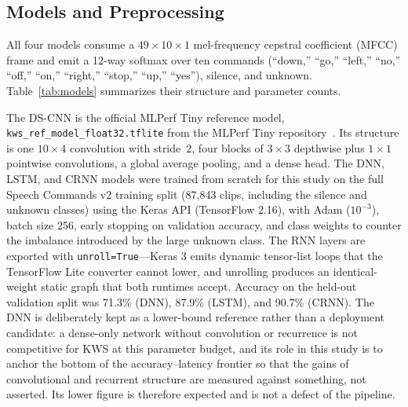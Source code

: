 \documentclass[conference,a4paper]{IEEEtran}
\begin{document}
\subsection{Models and Preprocessing}

All four models consume a $49 \times 10 \times 1$ mel-frequency cepstral coefficient (MFCC) frame and emit a 12-way softmax over ten commands (``down,'' ``go,'' ``left,'' ``no,'' ``off,'' ``on,'' ``right,'' ``stop,'' ``up,'' ``yes''), silence, and unknown. Table~\ref{tab:models} summarizes their structure and parameter counts.

\begin{table}[t]
\caption{Benchmark model set. All models share the $49\times10\times1$ MFCC input and a 12-way softmax head.}
\label{tab:models}
\centering
{\footnotesize
\setlength{\tabcolsep}{3pt}
}
\end{table}

The DS-CNN is the official MLPerf Tiny reference model, \texttt{kws\_ref\_model\_float32.tflite} from the MLPerf Tiny repository~\cite{mlcompostiny}. Its structure is one $10\times4$ convolution with stride~2, four blocks of $3\times3$ depthwise plus $1\times1$ pointwise convolutions, a global average pooling, and a dense head. The DNN, LSTM, and CRNN models were trained from scratch for this study on the full Speech Commands v2 training split (87{,}843 clips, including the silence and unknown classes) using the Keras API (TensorFlow 2.16), with Adam ($10^{-3}$), batch size 256, early stopping on validation accuracy, and class weights to counter the imbalance introduced by the large unknown class. The RNN layers are exported with \texttt{unroll=True}---Keras 3 emits dynamic tensor-list loops that the TensorFlow Lite converter cannot lower, and unrolling produces an identical-weight static graph that both runtimes accept. Accuracy on the held-out validation split was 71.3\% (DNN), 87.9\% (LSTM), and 90.7\% (CRNN). The DNN is deliberately kept as a lower-bound reference rather than a deployment candidate: a dense-only network without convolution or recurrence is not competitive for KWS at this parameter budget, and its role in this study is to anchor the bottom of the accuracy--latency frontier so that the gains of convolutional and recurrent structure are measured against something, not asserted. Its lower figure is therefore expected and is not a defect of the pipeline.
\end{document}
